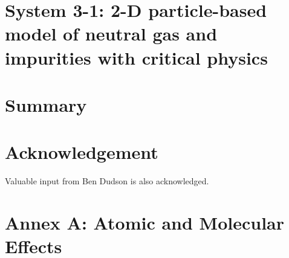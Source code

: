 \documentclass[11pt,twoside,a4paper]{article}
\begin{document}
\section{System 3-1: 2-D particle-based model of neutral gas and impurities with critical physics} \label{sec:sys3-1}

%
%
%
%
%
\clearpage
\section{Summary}\label{sec:summ}

\section*{Acknowledgement}\label{sec:ackn}

Valuable input from Ben Dudson is also acknowledged.




\appendix
\section{Annex A: Atomic and Molecular Effects}\label{sec:atomic}

\end{document}
